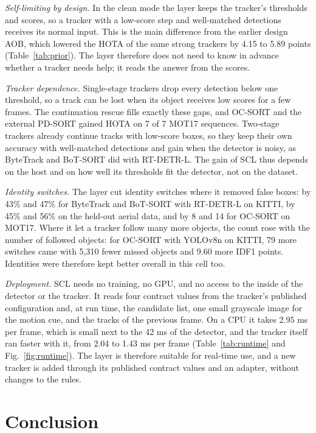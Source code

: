 \documentclass[pdflatex,sn-mathphys-num,iicol]{sn-jnl}
\newcommand{\scl}{SCL}
\newcommand{\aob}{AOB}
\begin{document}
\emph{Self-limiting by design.} In the clean mode the layer keeps the tracker's thresholds and
scores, so a tracker with a low-score step and well-matched detections receives its normal input.
This is the main difference from the earlier design \aob{}, which lowered the HOTA of the same
strong trackers by 4.15 to 5.89 points (Table~\ref{tab:prior}). The layer therefore does not need
to know in advance whether a tracker needs help; it reads the answer from the scores.

\emph{Tracker dependence.} Single-stage trackers drop every detection below one threshold, so a
track can be lost when its object receives low scores for a few frames. The continuation rescue
fills exactly these gaps, and OC-SORT and the external PD-SORT gained HOTA on 7 of 7 MOT17 sequences.
Two-stage trackers already continue tracks with low-score boxes, so they keep their own accuracy
with well-matched detections and gain when the detector is noisy, as ByteTrack and BoT-SORT did with
RT-DETR-L. The gain of \scl{} thus depends on the host and on how well its thresholds fit the
detector, not on the dataset.

\emph{Identity switches.} The layer cut identity switches where it removed false boxes: by 43\% and
47\% for ByteTrack and BoT-SORT with RT-DETR-L on KITTI, by 45\% and 56\% on the held-out aerial
data, and by 8 and 14 for OC-SORT on MOT17. Where it let a tracker follow many more objects, the
count rose with the number of followed objects: for OC-SORT with YOLOv8n on KITTI, 79 more switches
came with 5,310 fewer missed objects and 9.60 more IDF1 points. Identities were therefore kept
better overall in this cell too.

\emph{Deployment.} \scl{} needs no training, no GPU, and no access to the inside of the detector or
the tracker. It reads four contract values from the tracker's published configuration and, at run
time, the candidate list, one small grayscale image for the motion cue, and the tracks of the
previous frame. On a CPU it takes 2.95 ms per frame, which is small next to the 42 ms of the
detector, and the tracker itself ran faster with it, from 2.04 to 1.43 ms per frame
(Table~\ref{tab:runtime} and Fig.~\ref{fig:runtime}). The layer is therefore suitable for real-time
use, and a new tracker is added through its published contract values and an adapter, without
changes to the rules.
\section{Conclusion}\label{sec:conclusion}
\end{document}
